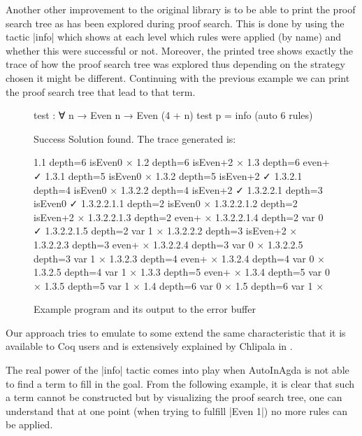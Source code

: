 \documentclass[a4paper]{article}
\begin{document}
Another other improvement to the original library is to be able to print the proof
search tree as has been explored during proof search. This is done by using the
tactic |info| which shows at each level which rules were applied (by name) and
whether this were successful or not. Moreover, the printed tree shows exactly
the trace of how the proof search tree was explored thus depending on the
strategy chosen it might be different. Continuing with the previous example we
can print the proof search tree that lead to that term.

\begin{figure}[h]
\noindent\begin{minipage}{.40\textwidth}
\scriptsize
\begin{code}
  test : ∀ {n} → Even n → Even (4 + n)
  test p = info (auto 6 rules)
\end{code}
\end{minipage}
\begin{minipage}{.55\textwidth}
\scriptsize
\begin{code}
Success Solution found. The trace generated is:

1.1 depth=6 isEven0 ×
1.2 depth=6 isEven+2 ×
1.3 depth=6 even+ ✓
1.3.1 depth=5 isEven0 ×
1.3.2 depth=5 isEven+2 ✓
1.3.2.1 depth=4 isEven0 ×
1.3.2.2 depth=4 isEven+2 ✓
1.3.2.2.1 depth=3 isEven0 ✓
1.3.2.2.1.1 depth=2 isEven0 ×
1.3.2.2.1.2 depth=2 isEven+2 ×
1.3.2.2.1.3 depth=2 even+ ×
1.3.2.2.1.4 depth=2 var 0 ✓
1.3.2.2.1.5 depth=2 var 1 ×
1.3.2.2.2 depth=3 isEven+2 ×
1.3.2.2.3 depth=3 even+ ×
1.3.2.2.4 depth=3 var 0 ×
1.3.2.2.5 depth=3 var 1 ×
1.3.2.3 depth=4 even+ ×
1.3.2.4 depth=4 var 0 ×
1.3.2.5 depth=4 var 1 ×
1.3.3 depth=5 even+ ×
1.3.4 depth=5 var 0 ×
1.3.5 depth=5 var 1 ×
1.4 depth=6 var 0 ×
1.5 depth=6 var 1 ×
\end{code}
\end{minipage}
  \caption{Example program and its output to the error buffer}
\end{figure}

Our approach tries to emulate to some extend the same characteristic that it is
available to Coq users and is extensively explained by Chlipala in
\cite{9780262026659}.

The real power of the |info| tactic comes into play when AutoInAgda is not able
to find a term to fill in the goal. From the following example, it is clear that
such a term cannot be constructed but by visualizing the proof search tree, one
can understand that at one point (when trying to fulfill |Even 1|) no more rules
can be applied.
\end{document}
